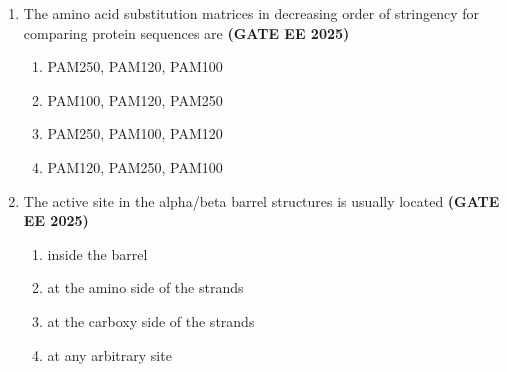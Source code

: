 \documentclass[journal,12pt,onecolumn]{IEEEtran}
\theoremstyle{remark}
\begin{document}
\begin{enumerate}
\item The amino acid substitution matrices in decreasing order of stringency for comparing protein sequences are  
\hfill \textbf{(GATE EE 2025)}

\begin{enumerate}
\item PAM250, PAM120, PAM100  
\item PAM100, PAM120, PAM250  
\item PAM250, PAM100, PAM120  
\item PAM120, PAM250, PAM100  
\end{enumerate}


\item The active site in the alpha/beta barrel structures is usually located  
\hfill \textbf{(GATE EE 2025)}

\begin{enumerate}
\item inside the barrel  
\item at the amino side of the strands  
\item at the carboxy side of the strands  
\item at any arbitrary site  
\end{enumerate}


\end{enumerate}
\end{document}
